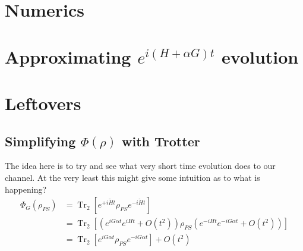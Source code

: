 \documentclass{article}
\newcommand{\parens}[1]{\left( #1 \right)}
\newcommand{\brackets}[1]{\left[ #1 \right]}
\newcommand{\bigo}[1]{O\left( #1 \right)}
\DeclareMathOperator{\Tr}{Tr}
\newcommand{\partrace}[2]{\Tr_{#1} \brackets{ #2 }}
\begin{document}
\section{Numerics}



\section{Approximating $e^{i (H + \alpha G) t}$ evolution}


\section{Leftovers}



\subsection{Simplifying $\Phi(\rho)$ with Trotter}
The idea here is to try and see what very short time evolution does to our channel. At the very least this might give some intuition as to what is happening?
\begin{align}
    \Phi_G(\rho_{PS}) &= \partrace{2}{e^{+i\widetilde{H}t} \rho_{PS} e^{-i \widetilde{H} t}} \\
    &= \partrace{2}{\parens{e^{i G \alpha t} e^{i H t} + \bigo{t^2}} \rho_{PS} \parens{e^{-iHt} e^{-i G \alpha t} + \bigo{t^2}}} \\
    &= \partrace{2}{e^{i G \alpha t} \rho_{PS} e^{-i G \alpha t}} + \bigo{t^2} 
\end{align}
\end{document}
